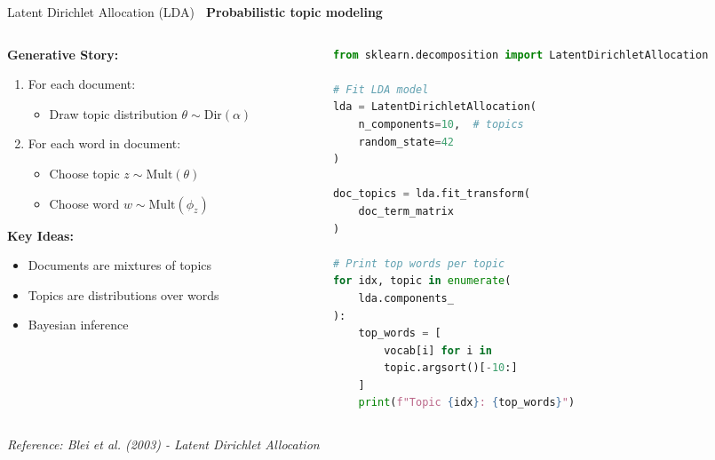 \documentclass[aspectratio=169]{beamer}
\begin{document}
\begin{frame}[fragile,shrink=10]{Latent Dirichlet Allocation (LDA) 🎲}
\textbf{Probabilistic topic modeling}

\vspace{0.5em}

\begin{columns}[T]
\begin{column}{0.48\textwidth}
\textbf{Generative Story:}
\begin{enumerate}\setlength{\itemsep}{0pt}
    \item For each document:
    \begin{itemize}\setlength{\itemsep}{0pt}
        \item Draw topic distribution $\theta \sim \text{Dir}(\alpha)$
    \end{itemize}
    \item For each word in document:
    \begin{itemize}\setlength{\itemsep}{0pt}
        \item Choose topic $z \sim \text{Mult}(\theta)$
        \item Choose word $w \sim \text{Mult}(\phi_z)$
    \end{itemize}
\end{enumerate}

\vspace{0.5em}
\textbf{Key Ideas:}
\begin{itemize}\setlength{\itemsep}{0pt}
    \item Documents are mixtures of topics
    \item Topics are distributions over words
    \item Bayesian inference
\end{itemize}
\end{column}

\begin{column}{0.48\textwidth}
\begin{lstlisting}[language=Python]
from sklearn.decomposition import LatentDirichletAllocation

# Fit LDA model
lda = LatentDirichletAllocation(
    n_components=10,  # topics
    random_state=42
)

doc_topics = lda.fit_transform(
    doc_term_matrix
)

# Print top words per topic
for idx, topic in enumerate(
    lda.components_
):
    top_words = [
        vocab[i] for i in
        topic.argsort()[-10:]
    ]
    print(f"Topic {idx}: {top_words}")
\end{lstlisting}
\end{column}
\end{columns}

\vspace{0.5em}
\small
\textit{Reference: Blei et al. (2003) - Latent Dirichlet Allocation}
\end{frame}
\end{document}
